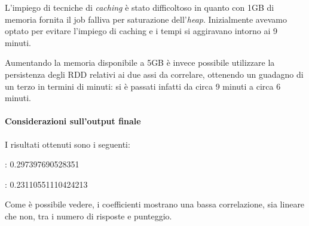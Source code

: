   L'impiego di tecniche di \textit{caching} è stato difficoltoso in quanto con 1GB di memoria fornita il job falliva per saturazione dell'\textit{heap}.
  Inizialmente avevamo optato per evitare l'impiego di caching e i tempi si aggiravano intorno ai 9 minuti.

  Aumentando la memoria disponibile a 5GB è invece possibile utilizzare la persistenza degli RDD relativi ai due assi da correlare, ottenendo un guadagno di un terzo in termini di minuti:
  si è passati infatti da circa 9 minuti a circa 6 minuti.

  \paragraph{Considerazioni sull'output finale}

  I risultati ottenuti sono i seguenti:

  \begin{description}[itemsep=1pt]
    \item[\textit{Coefficiente di \textbf{Pearson}}]: 0.297397690528351
    \item[\textit{Coefficiente di \textbf{Spearman}}]: 0.23110551110424213
  \end{description}

  Come è possibile vedere, i coefficienti mostrano una bassa correlazione, sia lineare che non, tra i numero di risposte e punteggio.
